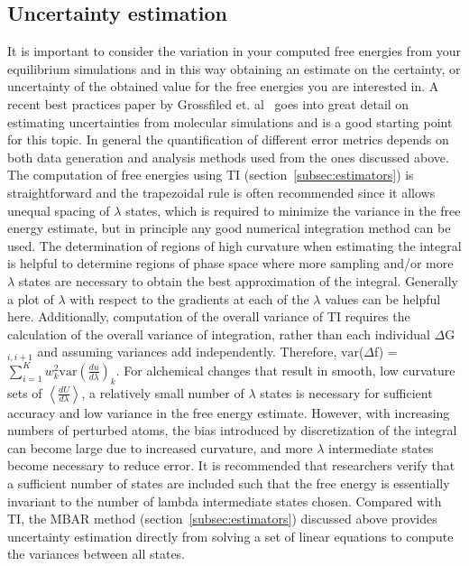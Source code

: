 \documentclass[9pt,bestpractices]{livecoms}
\newcommand{\expect}[1]{\left\langle{#1}\right\rangle}
\begin{document}
\subsection{Uncertainty estimation}
\label{subsec:uncertainty}
It is important to consider the variation in your computed free energies from your equilibrium simulations and in this way obtaining an estimate on the certainty, or uncertainty of the obtained value for the free energies you are interested in. A recent best practices paper by Grossfiled et. al~\cite{grossfield2018best} goes into great detail on estimating uncertainties from molecular simulations and is a good starting point for this topic. 
In general the quantification of different error metrics depends on both data generation and analysis methods  used from the ones discussed above. 
%
The computation of free energies using TI (section~\ref{subsec:estimators}) is straightforward and the trapezoidal rule is often recommended since it allows unequal spacing of $\lambda$ states, which is required to minimize the variance in the free energy estimate, but in principle any good numerical integration method can be used. 
The determination of regions of high curvature when estimating the integral is helpful to determine regions of phase space where more sampling and/or more $\lambda$ states are necessary to obtain the best approximation of the integral. Generally a plot of $\lambda$ with respect to the gradients at each of the $\lambda$ values can be helpful here. 
Additionally, computation of the overall variance of TI requires the calculation of the overall variance of integration, rather than each individual $\Delta$G$_{i,i+1}$ and assuming variances add independently. 
Therefore, $\mathrm{var}$($\Delta$f) = $\sum_{i=1}^{K}w_{k}^2 \mathrm{var}(\frac{du}{d\lambda})_{k}$.
%
For alchemical changes that result in smooth, low curvature sets of $\expect{\frac{dU}{d\lambda}}$, a relatively small number of $\lambda$ states is necessary for sufficient accuracy and low variance in the free energy estimate. 
However, with increasing numbers of perturbed atoms, the bias introduced by discretization of the integral can become large due to increased curvature, and more $\lambda$ intermediate states become necessary to reduce error.
It is recommended that researchers verify that a sufficient number of states are included such that the free energy is essentially invariant to the number of lambda intermediate states chosen.
%
Compared with TI, the MBAR method (section~\ref{subsec:estimators}) discussed above provides uncertainty estimation directly from solving a set of linear equations to compute the variances between all states. 
\end{document}
